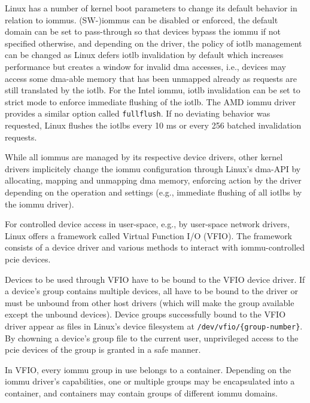 Linux has a number of kernel boot parameters to change its default behavior in
relation to \acp{iommu}. (SW-)\acp{iommu} can be disabled or enforced, the
default domain can be set to pass-through so that devices bypass the \ac{iommu}
if not specified otherwise, and depending on the driver, the policy of
\ac{iotlb} management can be changed as Linux defers \ac{iotlb} invalidation by
default which increases performance but creates a window for invalid \ac{dma}
accesses, i.e., devices may access some \ac{dma}-able memory that has been
unmapped already as requests are still translated by the \ac{iotlb}. For the
Intel \ac{iommu}, \ac{iotlb} invalidation can be set to strict mode to enforce
immediate flushing of the \ac{iotlb}. The AMD \ac{iommu} driver provides a
similar option called \texttt{fullflush}. If no deviating behavior was
requested, Linux flushes the \acp{iotlb} every 10 ms or every 256 batched
invalidation requests.

While all \acp{iommu} are managed by its respective device drivers, other kernel
drivers implicitely change the \ac{iommu} configuration through Linux's
\ac{dma}-API by allocating, mapping and unmapping \ac{dma} memory, enforcing
action by the driver depending on the operation and settings (e.g., immediate
flushing of all \acp{iotlb} by the \ac{iommu} driver).

For controlled device access in user-space, e.g., by user-space network drivers,
Linux offers a framework called Virtual Function I/O (VFIO). The framework
consists of a device driver and various methods to interact with
\ac{iommu}-controlled \ac{pcie} devices.

Devices to be used through VFIO have to be bound to the VFIO device driver. If a
device's group contains multiple devices, all have to be bound to the driver or
must be unbound from other host drivers (which will make the group available
except the unbound devices). Device groups successfully bound to the VFIO driver
appear as files in Linux's device filesystem at \linebreak
\texttt{/dev/vfio/\{group-number\}}. By chowning a device's group file to the
current user, unprivileged access to the \ac{pcie} devices of the group is
granted in a safe manner.

In VFIO, every \ac{iommu} group in use belongs to a container. Depending on the
\ac{iommu} driver's capabilities, one or multiple groups may be encapsulated
into a container, and containers may contain groups of different \ac{iommu}
domains.

